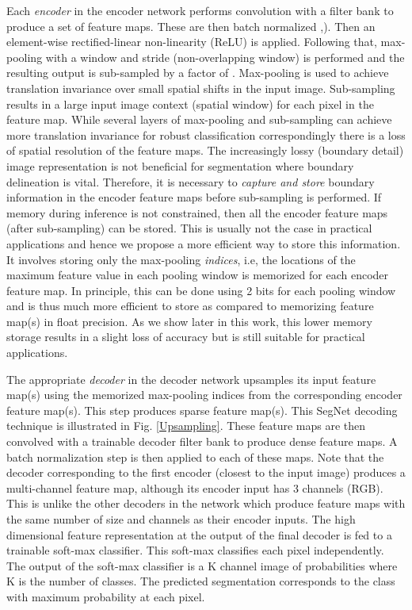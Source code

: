 \documentclass[10pt,journal,compsoc]{IEEEtran}
\begin{document}
Each \textit{encoder} in the encoder network performs convolution with a filter bank to produce a set of feature maps. These are then batch normalized \cite{BN},\cite{badrinarayananunderstanding}). Then an element-wise rectified-linear non-linearity (ReLU)  is applied. Following that, max-pooling with a  window and stride  (non-overlapping window) is performed and the resulting output is sub-sampled by a factor of . Max-pooling is used to achieve translation invariance over small spatial shifts in the input image. Sub-sampling results in a large input image context (spatial window) for each pixel in the feature map. While  several layers of max-pooling and sub-sampling can achieve more translation invariance for robust classification correspondingly there is a loss of spatial resolution of the feature maps. The increasingly lossy (boundary detail) image representation is not beneficial for segmentation where boundary delineation is vital. Therefore, it is necessary to \textit{capture and store} boundary information in the encoder feature maps before sub-sampling is performed. If memory during inference is not constrained, then all the encoder feature maps (after sub-sampling) can be stored. This is usually not the case in practical applications and hence we propose a more efficient way to store this information. It involves storing only the max-pooling \textit{indices}, i.e, the locations of the maximum feature value in each pooling window is memorized for each encoder feature map. In principle, this can be done using 2 bits for each  pooling window and is thus much more efficient to store as compared to memorizing feature map(s) in float precision. As we show later in this work, this lower memory storage results in a slight loss of accuracy but is still suitable for practical applications.

The appropriate \textit{decoder} in the decoder network upsamples its input feature map(s) using the memorized max-pooling indices from the corresponding encoder feature map(s). This step produces sparse feature map(s). This SegNet decoding technique is illustrated in Fig. \ref{Upsampling}. These feature maps are then convolved with a trainable decoder filter bank to produce dense feature maps. A batch normalization step is then applied to each of these maps. Note that the decoder corresponding to the first encoder (closest to the input image) produces a multi-channel feature map, although its encoder input has 3 channels (RGB). This is unlike the other decoders in the network which produce feature maps with the same number of size and channels as their encoder inputs. The high dimensional feature representation at the output of the final decoder is fed to a trainable soft-max classifier. This soft-max classifies each pixel independently. The output of the soft-max classifier is a K channel image of probabilities where K is the number of classes. The predicted segmentation corresponds to the class with maximum probability at each pixel.
\end{document}
